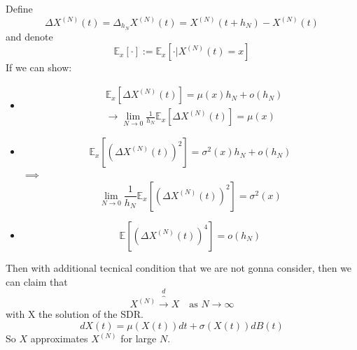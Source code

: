 \documentclass{article}
\begin{document}
Define 
\begin{equation*}
	\Delta X^{(N)}(t) = \Delta _{h_N}X^{(N)}(t) = X^{(N)}(t+h_N) - X^{(N)}(t)
\end{equation*}
and denote 
\begin{equation*}
	\mathbb{E}_x[\cdot] := \mathbb{E}_x[\cdot | X^{(N)}(t) = x] 
\end{equation*}
If we can show:
\begin{itemize}
	\item 
	\begin{align*}
		&\mathbb{E}_x[\Delta X^{(N)}(t)]=\mu(x) h_N + o(h_N) \\
		&\rightarrow \lim_{N \rightarrow 0} \frac{1}{h_N} \mathbb{E}_x[\Delta X^{(N)}(t)]=\mu(x)
	\end{align*}
	\item 
	\begin{equation*}
		\mathbb{E}_x[(\Delta X^{(N)}(t))^2] = \sigma^2(x)h_N + o (h_N)
	\end{equation*}
	$\implies$ 
	\begin{equation*}
		\lim_{N \rightarrow 0} \frac{1}{h_N} \mathbb{E}_x[(\Delta X^{(N)}(t))^2] = \sigma^2(x)
	\end{equation*}
	\item  
	\begin{equation*}
		\mathbb{E}[(\Delta X^{(N)}(t))^4]= o(h_N)
	\end{equation*}
\end{itemize}
Then with additional tecnical condition that we are not gonna consider, then we can claim that
$$X^{(N)} \overbrace{\rightarrow}^{d} X \quad \text{as } N \rightarrow \infty$$
with X the solution of the SDR.
$$dX(t) = \mu(X(t))dt+\sigma(X(t))dB(t)$$
So $X$ approximates $X^{(N)}$ for large $N$.\\
\end{document}
